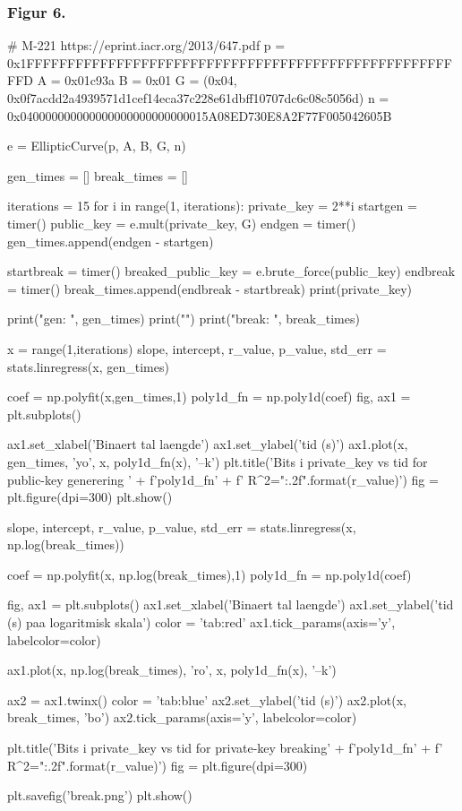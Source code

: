 \subsubsection{Figur 6.}
\label{section:figur_6}
\begin{python}
# M-221 https://eprint.iacr.org/2013/647.pdf
p = 0x1FFFFFFFFFFFFFFFFFFFFFFFFFFFFFFFFFFFFFFFFFFFFFFFFFFFFFFD
A = 0x01c93a
B = 0x01
G = (0x04, 0x0f7acdd2a4939571d1cef14eca37c228e61dbff10707dc6c08c5056d)
n = 0x040000000000000000000000000015A08ED730E8A2F77F005042605B

e = EllipticCurve(p, A, B, G, n)

gen_times = []
break_times = []

iterations = 15
for i in range(1, iterations):
    private_key = 2**i
    startgen = timer()
    public_key = e.mult(private_key, G)
    endgen = timer()
    gen_times.append(endgen - startgen)

    startbreak = timer()
    breaked_public_key = e.brute_force(public_key)
    endbreak = timer()
    break_times.append(endbreak - startbreak)
    print(private_key)

print("gen: ", gen_times)
print("")
print("break: ", break_times)

x = range(1,iterations)
slope, intercept, r_value, p_value, std_err = stats.linregress(x, gen_times)

coef = np.polyfit(x,gen_times,1)
poly1d_fn = np.poly1d(coef) 
fig, ax1 = plt.subplots()


ax1.set_xlabel('Binaert tal laengde')
ax1.set_ylabel('tid (s)')
ax1.plot(x, gen_times, 'yo', x, poly1d_fn(x), '--k')
plt.title('Bits i private_key vs tid for public-key generering ' + f'{poly1d_fn}' + f'   R^2={"{:.2f}".format(r_value)}')
fig = plt.figure(dpi=300)
plt.show()

slope, intercept, r_value, p_value, std_err = stats.linregress(x, np.log(break_times))

coef = np.polyfit(x, np.log(break_times),1)
poly1d_fn = np.poly1d(coef) 

fig, ax1 = plt.subplots()
ax1.set_xlabel('Binaert tal laengde')
ax1.set_ylabel('tid (s) paa logaritmisk skala')
color = 'tab:red'
ax1.tick_params(axis='y', labelcolor=color)

ax1.plot(x, np.log(break_times), 'ro', x, poly1d_fn(x), '--k')

ax2 = ax1.twinx()
color = 'tab:blue'
ax2.set_ylabel('tid (s)')
ax2.plot(x, break_times, 'bo')
ax2.tick_params(axis='y', labelcolor=color)

plt.title('Bits i private_key vs tid for private-key breaking' + f'{poly1d_fn}' + f'   R^2={"{:.2f}".format(r_value)}')
fig = plt.figure(dpi=300)

plt.savefig('break.png')
plt.show()
\end{python}


